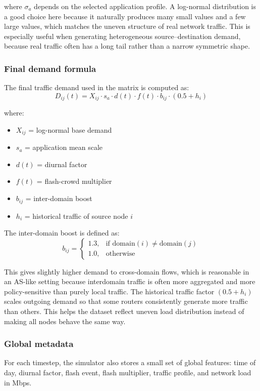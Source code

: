 \documentclass[12pt]{article}
\begin{document}
where $\sigma_a$ depends on the selected application profile. A log-normal distribution is a good choice here because it naturally produces many small values and a few large values, which matches the uneven structure of real network traffic. This is especially useful when generating heterogeneous source--destination demand, because real traffic often has a long tail rather than a narrow symmetric shape.


\subsubsection{Final demand formula}

The final traffic demand used in the matrix is computed as:
\[
D_{ij}(t) = X_{ij} \cdot s_a \cdot d(t) \cdot f(t) \cdot b_{ij} \cdot (0.5 + h_i)
\]

where:
\begin{itemize}
    \item $X_{ij}$ = log-normal base demand
    \item $s_a$ = application mean scale
    \item $d(t)$ = diurnal factor
    \item $f(t)$ = flash-crowd multiplier
    \item $b_{ij}$ = inter-domain boost
    \item $h_i$ = historical traffic of source node $i$
\end{itemize}

The inter-domain boost is defined as:
\[
b_{ij} =
\begin{cases}
1.3, & \text{if } \mathrm{domain}(i) \neq \mathrm{domain}(j) \\
1.0, & \text{otherwise}
\end{cases}
\]

This gives slightly higher demand to cross-domain flows, which is reasonable in an AS-like setting because interdomain traffic is often more aggregated and more policy-sensitive than purely local traffic. The historical traffic factor $(0.5 + h_i)$ scales outgoing demand so that some routers consistently generate more traffic than others. This helps the dataset reflect uneven load distribution instead of making all nodes behave the same way.

\subsubsection{Global metadata}
For each timestep, the simulator also stores a small set of global features: time of day, diurnal factor, flash event, flash multiplier, traffic profile, and network load in Mbps.
\end{document}
